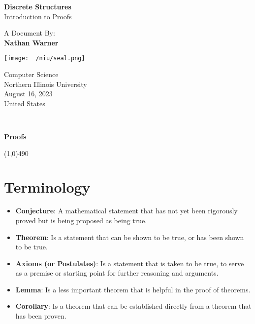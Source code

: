 \documentclass{report}
\title{\Huge{}}
\author{\huge{Nathan Warner}}
\date{\huge{}}
\begin{document}
        \begin{titlepage}
       \begin{center}
           \vspace*{1cm}
    
           \textbf{Discrete Structures} \\
           Introduction to Proofs
    
           \vspace{0.5cm}
            
                
           \vspace{1.5cm}
            A Document By: \\ 
           \textbf{Nathan Warner}
    
           \vfill
                
                
           \vspace{0.8cm}
         
           \texttt{[image: ~/niu/seal.png]}
                
           Computer Science \\
           Northern Illinois University\\
           August 16, 2023 \\
           United States\\
           
                
       \end{center}
    \end{titlepage}
    \tableofcontents
    \pagebreak \bigbreak \noindent
    \vspace{2in} \\
    \begin{Huge}
        \textbf{Proofs}
    \end{Huge}
    \bigbreak \noindent 
    \line(1,0){490}
    \bigbreak \noindent 
    \section{\LARGE Terminology}
    \bigbreak \noindent 
    \begin{itemize}
        \item \textbf{Conjecture}: A mathematical statement that has not yet been rigorously proved but is being proposed as being true.
        \item \textbf{Theorem}: Is a statement that can be shown to be true, or has been shown to be true.
        \item \textbf{Axioms (or Postulates)}: Is a statement that is taken to be true, to serve as a premise or starting point for further reasoning and arguments.
        \item \textbf{Lemma}: Is a less important theorem that is helpful in the proof of theorems.
        \item \textbf{Corollary}: Is a theorem that can be established directly from a theorem that has been proven.
    \end{itemize}
    \bigbreak \noindent \bigbreak \noindent 
\end{document}
